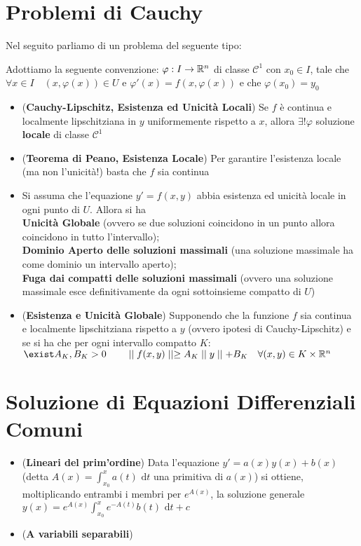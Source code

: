 \documentclass[a4paper,NoNotes,GeneralMath]{stdmdoc}
\newcommand{\de}{\mbox{  d}}
\begin{document}
	\section*{Problemi di Cauchy}
	Nel seguito parliamo di un problema del seguente tipo:
	\par
	Adottiamo la seguente convenzione: $\varphi: I \rightarrow \RR^n$ di classe $\mathcal{C}^1$ con $x_0 \in I$, tale che $\forall x \in I \quad (x, \varphi(x)) \in U$ e $\varphi'(x) = f(x, \varphi(x))$ e che $\varphi(x_0) = y_0$
	\begin{itemize}
		\item ({\bf Cauchy-Lipschitz, Esistenza ed Unicità Locali}) Se $f$ è continua e localmente lipschitziana in $y$ uniformemente rispetto a $x$, allora $\exists! \varphi$ soluzione {\bf locale} di classe $\mathcal{C}^1$
		\item ({\bf Teorema di Peano, Esistenza Locale}) Per garantire l'esistenza locale (ma non l'unicità!) basta che $f$ sia continua
		\item Si assuma che l'equazione $y' = f(x,y)$ abbia esistenza ed unicità locale in ogni punto di $U$. Allora si ha \\ {\bf Unicità Globale} (ovvero se due soluzioni coincidono in un punto allora coincidono in tutto l'intervallo); \\ {\bf Dominio Aperto delle soluzioni massimali} (una soluzione massimale ha come dominio un intervallo aperto); \\ {\bf Fuga dai compatti delle soluzioni massimali} (ovvero una soluzione massimale esce definitivamente da ogni sottoinsieme compatto di $U$)
		\item ({\bf Esistenza e Unicità Globale}) Supponendo che la funzione $f$ sia continua e localmente lipschitziana rispetto a $y$ (ovvero ipotesi di Cauchy-Lipschitz) e se si ha che per ogni intervallo compatto $K$: $\exist A_K, B_K > 0 \qquad \Norm{f(x,y)} \ge A_K \Norm{y} + B_K \quad \forall (x,y) \in K \times \RR^n$
	\end{itemize}

	\section*{Soluzione di Equazioni Differenziali Comuni}
	\begin{itemize}
		\item ({\bf Lineari del prim'ordine}) Data l'equazione $y' = a(x)y(x) + b(x)$ (detta $A(x) = \int_{x_0}^{x} a(t) \de t$ una primitiva di $a(x)$) si ottiene, moltiplicando entrambi i membri per $e^{A(x)}$, la soluzione generale $y(x) = e^{A(x)} \int_{x_0}^{x} e^{-A(t)}b(t) \de t + c$
		\item ({\bf A variabili separabili})
	\end{itemize}
\end{document}
